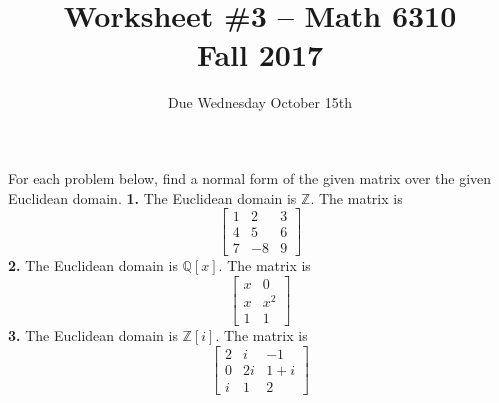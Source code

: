 \documentclass[11pt]{amsart}
\theoremstyle{theorem}
\newcommand{\bQ}{\mathbb{Q}}
\newcommand{\bZ}{\mathbb{Z}}
\begin{document}
\title{Worksheet \#3 -- Math 6310\\Fall 2017}
\author{Due Wednesday October 15th}
\maketitle
For each problem below, find a normal form of the given matrix over the given Euclidean domain.
\vskip 9pt
\noindent
{\bf 1.}  The Euclidean domain is $\bZ$.  The matrix is
\[
\left[ \begin{array}{ccc}  
1 & 2 & 3 \\
4 & 5 & 6 \\
7 & -8 & 9
\end{array}  \right]
\]
\vskip 115pt
\noindent
{\bf 2.}  The Euclidean domain is $\bQ[x]$.  The matrix is
\[
\left[ \begin{array}{cc}
x & 0  \\
x & x^2  \\
1 & 1 
\end{array}  \right]
\]
\vskip 115pt
\noindent
{\bf 3.}  The Euclidean domain is $\bZ[i]$.  The matrix is
\[
\left[ \begin{array}{ccc}
2 & i & -1 \\
0 & 2i & 1+i \\
i & 1 & 2
\end{array}
\right]
\]
\end{document}
